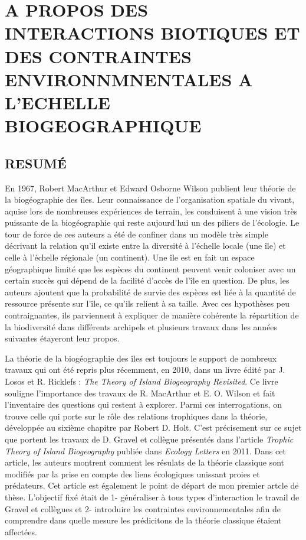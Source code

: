 \chapter{A PROPOS DES INTERACTIONS BIOTIQUES ET DES CONTRAINTES ENVIRONNMNENTALES A L'ECHELLE BIOGEOGRAPHIQUE}

\section{RESUMÉ}
%
En 1967, Robert MacArthur et Edward Osborne Wilson publient leur théorie de la biogéographie des îles.
Leur connaissance de l'organisation spatiale du vivant, aquise lors de nombreuses expériences de terrain, les conduisent à une vision très puissante de la biogéographie qui reste aujourd'hui un des piliers de l'écologie.
Le tour de force de ces auteurs a été de confiner dans un modèle très simple décrivant la relation qu'il existe entre la diversité à l'échelle locale (une île) et celle à l'échelle régionale (un continent).
Une île est en fait un espace géographique limité que les espèces du continent peuvent venir coloniser avec un certain succès qui dépend de la facilité d'accès de l'île en question.
De plus, les auteurs ajoutent que la probabilité de survie des espèces est liée à la quantité de ressource présente sur l'île, ce qu'ils relient à sa taille.
Avec ces hypothèses peu contraignantes, ils parviennent à expliquer de manière cohérente la répartition de la biodiversité dans différents archipels et plusieurs travaux dans les années suivantes étayeront leur propos.

La théorie de la biogéographie des îles est toujours le support de nombreux travaux qui ont été repris plus récemment, en 2010, dans un livre édité par J. Losos et R. Ricklefs : \textit{The Theory of Island Biogeography Revisited}.
Ce livre souligne l'importance des travaux de R. MacArthur et E. O. Wilson et fait l'inventaire des questions qui restent à explorer.
Parmi ces interrogations, on trouve celle qui porte sur le rôle des relations trophiques dans la théorie, développée au sixième chapitre par Robert D. Holt.
C'est précisement sur ce sujet que portent les travaux de D. Gravel et collègue présentés dans l'article \textit{Trophic Theory of Island Biogeography} publiée dans \textit{Ecology Letters} en 2011.
Dans cet article, les auteurs montrent comment les résulats de la théorie classique sont modifiés par la prise en compte des liens écologiques unissant proies et prédateurs.
Cet article est également le point de départ de mon premier artcle de thèse. L'objectif fixé était de 1- généraliser à tous types d'interaction le travail de Gravel et collègues et 2- introduire les contraintes environnementales afin de comprendre dans quelle mesure les prédicitons de la théorie classique étaient affectées.


